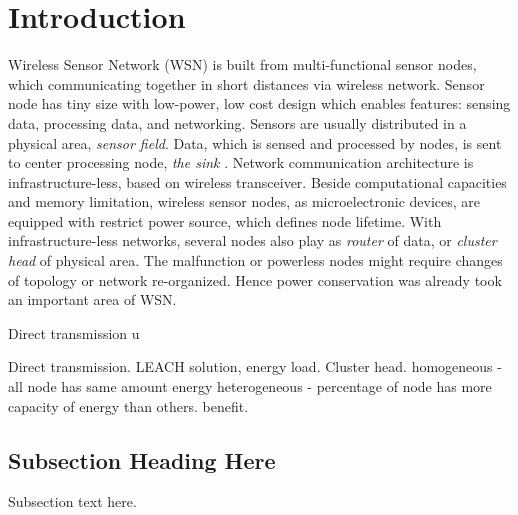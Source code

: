 \documentclass[conference]{IEEEtran}
\begin{document}
\section{Introduction}
Wireless Sensor Network (WSN) is built from multi-functional sensor nodes, which communicating together in short distances via wireless network. Sensor node has tiny size with low-power, low cost design which enables features: sensing data, processing data, and networking. Sensors are usually distributed in a physical area, \textit{sensor field}. Data, which is sensed and processed by nodes, is sent to center processing node, \textit{the sink} . Network communication architecture is infrastructure-less, based on wireless transceiver. Beside computational capacities and memory limitation, wireless sensor nodes, as microelectronic devices, are equipped with restrict power source, which defines node lifetime. With infrastructure-less networks, several nodes also play as \textit{router} of data, or \textit{cluster head} of physical area. The malfunction or powerless nodes might require changes of topology  or network re-organized. Hence power conservation was already took an important area of WSN\cite{Akyildiz2002}.

Direct transmission  \cite{Shepard}
u



 Direct transmission. LEACH solution, energy load. 
Cluster head. 
homogeneous - all node has same amount energy 
heterogeneous - percentage of node has more capacity of energy than others.
benefit.

 


 



\subsection{Subsection Heading Here}
Subsection text here.



%
\end{document}
